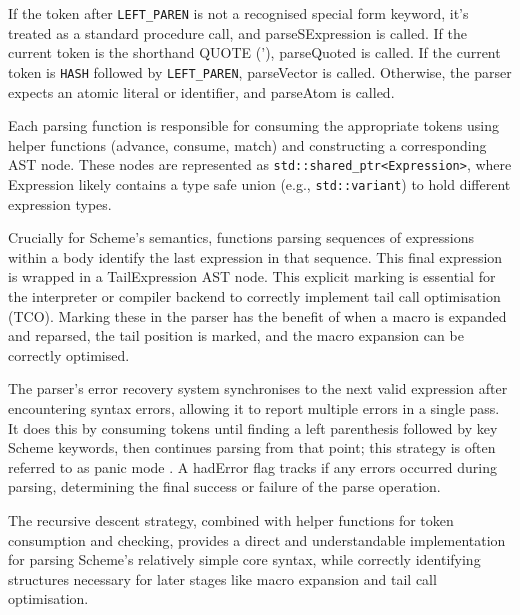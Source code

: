 \documentclass[final]{cmpreport_02}
\begin{document}
If the token after \texttt{LEFT\_PAREN} is not a recognised special form keyword, it's treated as a standard procedure call, and parseSExpression is called. If the current token is the shorthand QUOTE ('), parseQuoted is called. If the current token is \texttt{HASH} followed by \texttt{LEFT\_PAREN}, parseVector is called. Otherwise, the parser expects an atomic literal or identifier, and parseAtom is called.

Each parsing function is responsible for consuming the appropriate tokens using helper functions (advance, consume, match) and constructing a corresponding AST node. These nodes are represented as \texttt{std::shared\_ptr<Expression>}, where Expression likely contains a type safe union (e.g., \texttt{std::variant}) to hold different expression types.

Crucially for Scheme's semantics, functions parsing sequences of expressions within a body identify the last expression in that sequence. This final expression is wrapped in a TailExpression AST node. This explicit marking is essential for the interpreter or compiler backend to correctly implement tail call optimisation (TCO). Marking these in the parser has the benefit of when a macro is expanded and reparsed, the tail position is marked, and the macro expansion can be correctly optimised.

The parser's error recovery system synchronises to the next valid expression after encountering syntax errors, allowing it to report multiple errors in a single pass. It does this by consuming tokens until finding a left parenthesis followed by key Scheme keywords, then continues parsing from that point; this strategy is often referred to as panic mode \cite{nystrom2021crafting}. A hadError flag tracks if any errors occurred during parsing, determining the final success or failure of the parse operation.

The recursive descent strategy, combined with helper functions for token consumption and checking, provides a direct and understandable implementation for parsing Scheme's relatively simple core syntax, while correctly identifying structures necessary for later stages like macro expansion and tail call optimisation.
\end{document}
